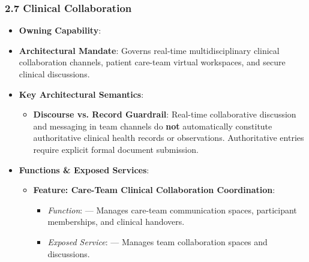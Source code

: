 \label{rad:ise:137}

\par\smallskip
{}\label{rad:ise:139}
\subsubsection*{2.7 Clinical Collaboration}
\label{rad:ise:140}

\begin{itemize}

\item
\textbf{Owning Capability}: \texttt{}



\item
\textbf{Architectural Mandate}: Governs real-time multidisciplinary clinical collaboration channels, patient care-team virtual workspaces, and secure clinical discussions.



\item
\textbf{Key Architectural Semantics}:


\begin{itemize}

\item
\textbf{Discourse vs. Record Guardrail}: Real-time collaborative discussion and messaging in team channels do \textbf{not} automatically constitute authoritative clinical health records or observations. Authoritative entries require explicit formal document submission.



\end{itemize}


\item
\textbf{Functions \& Exposed Services}:


\begin{itemize}

\item
\textbf{Feature: Care-Team Clinical Collaboration Coordination}:


\begin{itemize}

\item
\emph{Function}: \texttt{} — Manages care-team communication spaces, participant memberships, and clinical handovers.



\item
\emph{Exposed Service}: \texttt{} — Manages team collaboration spaces and discussions.




\end{itemize}
\end{itemize}
\end{itemize}
